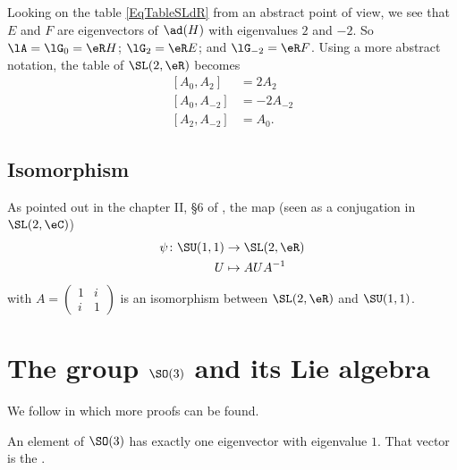 Looking on the table \eqref{EqTableSLdR} from an abstract point of view, we see that $E$ and $F$ are eigenvectors of $\ad(H)$ with eigenvalues $2$ and $-2$. So $\lA=\lG_0=\eR H$; $\lG_2=\eR E$; and $\lG_{-2}=\eR F$. Using a more abstract notation, the table of $\SL(2,\eR)$ becomes
\begin{subequations}  \label{subeq_rootSLR}
\begin{align}
  [A_{0},A_{2}]&=2A_{2}\\
	[A_{0},A_{-2}]&=-2A_{-2}\\
	[A_{2},A_{-2}]&=A_{0}.
\end{align}
\end{subequations}

\subsection{Isomorphism}

As pointed out in the chapter II, \S6 of \cite{Knapp_reprez}, the map (seen as a conjugation in $\SL(2,\eC)$)
\begin{equation}
	\begin{aligned}
		\psi\colon \SU(1,1)&\to \SL(2,\eR) \\ 
		U&\mapsto AUA^{-1} 
	\end{aligned}
\end{equation}
with $A=\begin{pmatrix}
1&i\\i&1
\end{pmatrix}$ is an isomorphism between $\SL(2,\eR)$ and $\SU(1,1)$.

					\section{The group \texorpdfstring{$\SO(3)$}{SO3} and its Lie algebra}
\label{SubSecTheGroupSotrois}

We follow \cite{WormerAngular} in which more proofs can be found.

\begin{proposition}
An element of $\SO(3)$ has exactly one eigenvector with eigenvalue $1$. That vector is the .
\end{proposition}

